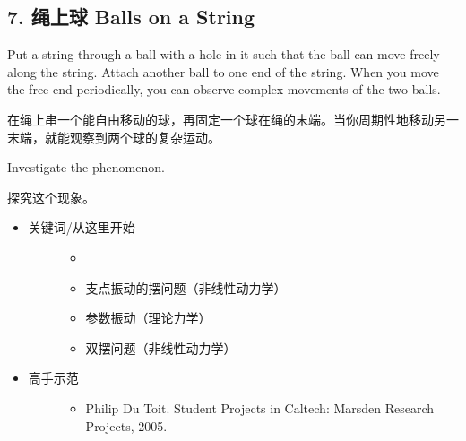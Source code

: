 \documentclass[a4paper,10pt,english]{sphinxmanual}
\begin{document}
\subsection{7. 绳上球 Balls on a String}
\label{\detokenize{7. Appendix:balls-on-a-string}}
Put a string through a ball with a hole in it such that the ball can move freely along the string. Attach another ball to one end of the string. When you move the free end periodically, you can observe complex movements of the two balls.

在绳上串一个能自由移动的球，再固定一个球在绳的末端。当你周期性地移动另一末端，就能观察到两个球的复杂运动。

Investigate the phenomenon.

探究这个现象。

\noindent{}
\begin{itemize}
\item {} \begin{description}
\item[{关键词/从这里开始}] \leavevmode\begin{itemize}
\item {} 

\item {} 
支点振动的摆问题（非线性动力学）

\item {} 
参数振动（理论力学）

\item {} 
双摆问题（非线性动力学）

\end{itemize}

\end{description}

\item {} \begin{description}
\item[{高手示范}] \leavevmode\begin{itemize}
\item {} 
Philip Du Toit.  Student Projects in Caltech: Marsden Research Projects, 2005.

\end{itemize}

\end{description}


\end{itemize}
\end{document}
